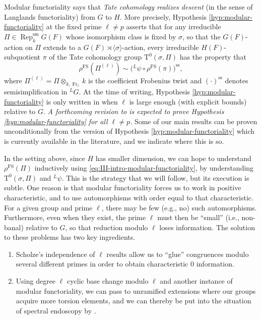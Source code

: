 \documentclass[reqno]{amsart}
\numberwithin{equation}{subsection}
\newcommand{\ld}{{}^L}
\DeclareMathOperator{\Rep}{Rep}
\DeclareMathOperator{\sm}{sm}
\DeclareMathOperator{\FS}{FS}
\DeclareMathOperator{\Fr}{Fr}
\newcommand{\rT}{\ensuremath{\mathrm{T}}\xspace}
\renewcommand{\ss}{\mathrm{ss}}
\theoremstyle{remark}
\numberwithin{equation}{subsection}
\numberwithin{figure}{subsection}
\begin{document}
Modular functoriality says that \emph{Tate cohomology realizes descent} (in the sense of Langlands functoriality) from $G$ to $H$. More precisely, Hypothesis \ref{hyp:modular-functoriality} at the fixed prime $\ell \neq p$ asserts that for any irreducible $\Pi \in \Rep_k^{\sm} G(F)$ whose isomorphism class is fixed by $\sigma$, so that the $G(F)$-action on $\Pi$ extends to a $G(F) \rtimes \langle\sigma\rangle$-action, every irreducible $H(F)$-subquotient $\pi$ of the Tate cohomology group $\rT^0(\sigma, \Pi)$ has the property that 
\begin{equation}\label{eq:III-intro-modular-functoriality}
\rho^{\FS}(\Pi^{(\ell)})
\sim \bigl(\ld\psi\circ\rho^{\FS}(\pi)\bigr)^{\ss},
\end{equation}
where $\Pi^{(\ell)}=\Pi\otimes_{k,\Fr_\ell}k$ is the coefficient Frobenius twist and $(\cdot)^{\ss}$ denotes semisimplification in $\ld G$.
At the time of writing, Hypothesis \ref{hyp:modular-functoriality} is only written in \cite{F24} when $\ell$ is large enough (with explicit bounds) relative to $G$. \emph{A forthcoming revision to \cite{F24} is expected to prove Hypothesis \ref{hyp:modular-functoriality} for all $\ell \neq p$.} Some of our main results can be proven unconditionally from the version of Hypothesis \ref{hyp:modular-functoriality} which is currently available in the literature, and we indicate where this is so. %


In the setting above, since $H$ has smaller dimension, we can hope to understand $\rho^{\FS}(\Pi)$ inductively using \eqref{eq:III-intro-modular-functoriality}, by understanding $\rT^0(\sigma, \Pi)$ and $\ld \psi$. This is the strategy that we will follow, but its execution is subtle. One reason is that modular functoriality forces us to work in positive characteristic, and to use automorphisms with order equal to that characteristic. For a given group and prime $\ell$, there may be few (e.g., no) such automorphisms. Furthermore, even when they exist, the prime $\ell$ must then be ``small'' (i.e., non-banal) relative to $G$, so that reduction modulo $\ell$ loses information. The solution to these problems has two key ingredients.
\begin{enumerate}
    \item Scholze's independence of $\ell$ results \cite[Theorem 1.1]{Sch25} allow us to ``glue'' congruences modulo several different primes in order to obtain characteristic $0$ information.
    \item Using degree $\ell$ cyclic base change modulo $\ell$ and another instance of modular functoriality, we can pass to unramified extensions where our groups acquire more torsion elements, and we can thereby be put into the situation of spectral endoscopy by \cite[Lemma~5.3.5]{Cot26b}.
\end{enumerate}
\end{document}
